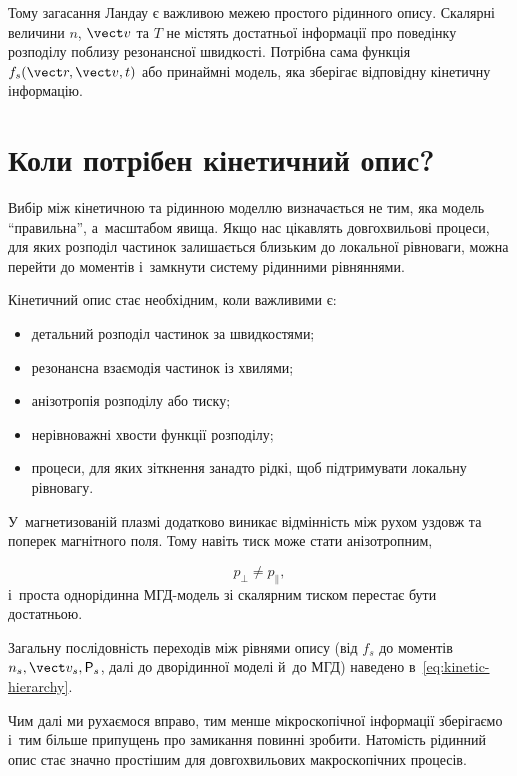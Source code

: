 Тому загасання Ландау є важливою межею простого рідинного опису. Скалярні величини $n$,
$\vect v$ та $T$ не містять достатньої інформації про поведінку розподілу поблизу
резонансної швидкості. Потрібна сама функція $f_s(\vect r,\vect v,t)$ або принаймні
модель, яка зберігає відповідну кінетичну інформацію.

\section{Коли потрібен кінетичний опис?}

Вибір між кінетичною та рідинною моделлю визначається не тим, яка модель
\enquote{правильна}, а~масштабом явища. Якщо нас цікавлять довгохвильові процеси, для яких
розподіл частинок залишається близьким до локальної рівноваги, можна перейти до моментів
і~замкнути систему рідинними рівняннями.

Кінетичний опис стає необхідним, коли важливими є:

\begin{itemize}
\item детальний розподіл частинок за швидкостями;
\item резонансна взаємодія частинок із хвилями;
\item анізотропія розподілу або тиску;
\item нерівноважні хвости функції розподілу;
\item процеси, для яких зіткнення занадто рідкі, щоб підтримувати локальну рівновагу.
\end{itemize}

У~магнетизованій плазмі додатково виникає відмінність між рухом уздовж та поперек
магнітного поля. Тому навіть тиск може стати анізотропним,

\begin{equation*}
p_\perp\neq p_\parallel,
\end{equation*}
%
і~проста однорідинна МГД-модель зі скалярним тиском перестає бути достатньою.

Загальну послідовність переходів між рівнями опису
(від $f_s$ до моментів $n_s,\vect v_s,\mathsf P_s$, далі до дворідинної моделі й~до МГД)
наведено в~\eqref{eq:kinetic-hierarchy}.

Чим далі ми рухаємося вправо, тим менше мікроскопічної інформації зберігаємо і~тим більше
припущень про замикання повинні зробити. Натомість рідинний опис стає значно простішим для
довгохвильових макроскопічних процесів.

